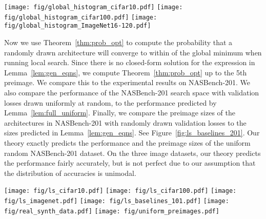 \documentclass[11pt]{article}
\numberwithin{equation}{section}
\numberwithin{figure}{section}
\theoremstyle{plain}
\theoremstyle{definition}
\begin{document}
\begin{figure*}
\centering \texttt{[image: fig/global\_histogram\_cifar10.pdf]}
\hspace{-3pt}
\texttt{[image: fig/global\_histogram\_cifar100.pdf]}
\hspace{-3pt}
\texttt{[image: fig/global\_histogram\_ImageNet16-120.pdf]}
\caption{
Histogram of validation losses for the three datasets in NASBench-201,
fitted with the best values of  and  in Equation~\ref{eq:normal_pdf}.
}
\label{fig:global_histogram}
\end{figure*}


Now we use Theorem~\ref{thm:prob_opt} to compute the 
probability that a randomly drawn architecture will converge to within 
of the global minimum when running local search.
Since there is no closed-form solution for the expression in Lemma~\ref{lem:gen_eqns},
we compute Theorem~\ref{thm:prob_opt} up to the 5th preimage.
We compare this to the experimental results on NASBench-201.
We also compare the performance of the NASBench-201 search space with validation losses drawn uniformly at random, 
to the performance predicted by Lemma~\ref{lem:full_uniform}.
Finally, we compare the preimage sizes of the architectures in NASBench-201 with
randomly drawn validation losses to the sizes predicted in Lemma~\ref{lem:gen_eqns}.
See Figure~\ref{fig:ls_baselines_201}.
Our theory exactly predicts the performance and the preimage sizes of the uniform 
random NASBench-201 dataset.
On the three image datasets, our theory predicts the performance
fairly accurately, but is not perfect due to our assumption that the distribution
of accuracies is unimodal.

\begin{figure*}
\centering \texttt{[image: fig/ls\_cifar10.pdf]}
\hspace{-3pt}
\texttt{[image: fig/ls\_cifar100.pdf]}
\hspace{-3pt}
\texttt{[image: fig/ls\_imagenet.pdf]}
\texttt{[image: fig/ls\_baselines\_101.pdf]}
\hspace{-3pt}
\texttt{[image: fig/real\_synth\_data.pdf]}
\hspace{-3pt}
\texttt{[image: fig/uniform\_preimages.pdf]}
\caption{
Results for NAS algorithms on NASBench-201 (top) and NASBench-101 (bottom left).
Probability that local search will converge to within 
of the global optimum, compared to Theorem~\ref{thm:prob_opt} (bottom middle).
Validation loss vs.\ size of preimages, compared to Lemma~\ref{lem:gen_eqns} (bottom right).
}
\label{fig:ls_baselines_201}

\end{figure*}
\end{document}
